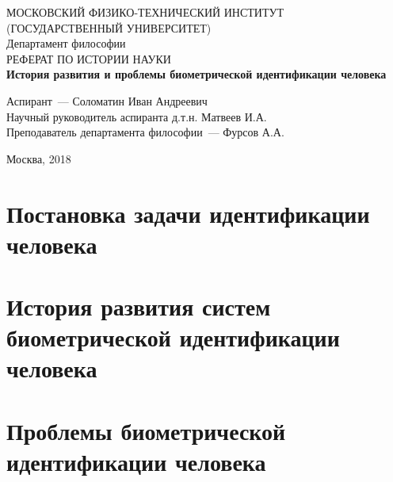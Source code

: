 \documentclass[14pt, a4paper]{extarticle}
\begin{document}
	\begin{titlepage}
		\begin{center}
			\hfill \break
			МОСКОВСКИЙ ФИЗИКО-ТЕХНИЧЕСКИЙ ИНСТИТУТ\\ (ГОСУДАРСТВЕННЫЙ УНИВЕРСИТЕТ)\\
			\hfill \break
			\hfill \break
			\hfill \break
			\hfill \break
			\hfill \break
			Департамент философии\\
			\hfill \break
			\hfill \break
			РЕФЕРАТ ПО ИСТОРИИ НАУКИ\\
			\hfill \break
			\hfill \break
			\large{\textbf{История развития и проблемы биометрической идентификации человека}}\\
			\hfill \break		
		\end{center}
		
		\begin{center}
			\hfill \break
			\parbox{0.9\textwidth}
			{
				Аспирант~--- Соломатин Иван Андреевич \\
				Научный руководитель аспиранта \underline{\hspace{3cm}} д.т.н. Матвеев И.А. \\
				Преподаватель департамента философии~--- Фурсов А.А. \\
			}
		\end{center}
		\hfill \break
		\hfill \break
		\hfill \break
		\hfill \break
		\begin{center} Москва, 2018 
		\end{center}
		\thispagestyle{empty} 
	\end{titlepage}
	
\tableofcontents
\newpage

\section{Постановка задачи идентификации человека}
\section{История развития систем биометрической идентификации человека}
\section{Проблемы биометрической идентификации человека}
	
\end{document}
